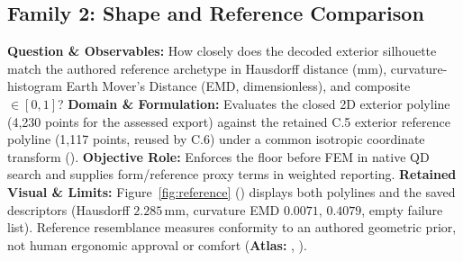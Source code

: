 \subsection{Family 2: Shape and Reference Comparison}
\label{subsec:family-reference}
\textbf{Question \& Observables:} How closely does the decoded exterior silhouette match the authored reference archetype in Hausdorff distance ($\mathrm{mm}$), curvature-histogram Earth Mover's Distance (EMD, dimensionless), and composite  $\in [0,1]$?
\textbf{Domain \& Formulation:} Evaluates the closed 2D exterior polyline (4,230 points for the assessed export) against the retained C.5 exterior reference polyline (1,117 points, reused by C.6) under a common isotropic coordinate transform ().
\textbf{Objective Role:} Enforces the  floor before FEM in native QD search and supplies form/reference proxy terms in weighted reporting.
\textbf{Retained Visual \& Limits:} Figure~\ref{fig:reference} () displays both polylines and the saved descriptors (Hausdorff $2.285\,\mathrm{mm}$, curvature EMD $0.0071$,  $0.4079$, empty failure list). Reference resemblance measures conformity to an authored geometric prior, not human ergonomic approval or comfort (\textbf{Atlas:} , ).

